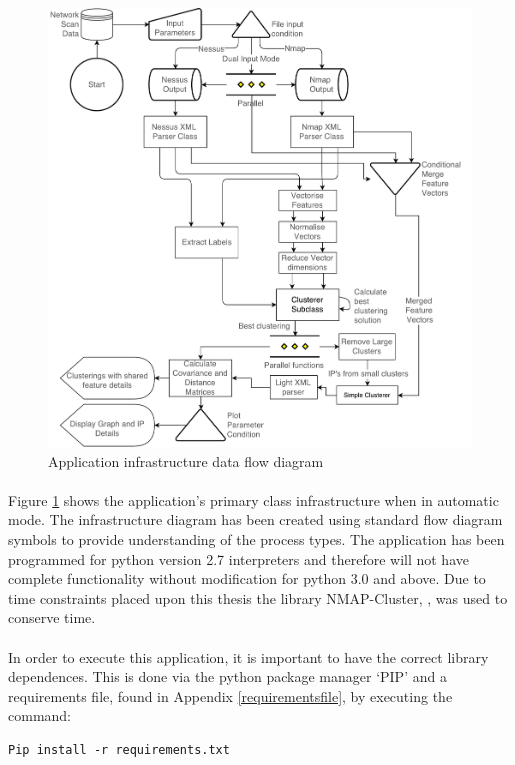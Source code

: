 \begin{figure}[!h]
\centering
\includegraphics[width=4.5in]{./Figures/flow.pdf}
\caption{Application infrastructure data flow diagram}
\label{flow}
\end{figure}

\paragraph{}Figure \ref{flow} shows the application’s primary class infrastructure when in automatic mode. The infrastructure diagram has been created using standard flow diagram symbols to provide understanding of the process types. The application has been programmed for python version 2.7 interpreters and therefore will not have complete functionality without modification for python 3.0 and above. Due to time constraints placed upon this thesis the library NMAP-Cluster, \cite{blackhatnmap}, was used to conserve time.

\paragraph{}In order to execute this application, it is important to have the correct library dependences. This is done via the python package manager ‘PIP’ and a requirements file, found in Appendix \ref{requirementsfile}, by executing the command:
\lstset{language=Python}
\begin{lstlisting}
Pip install -r requirements.txt
\end{lstlisting}

